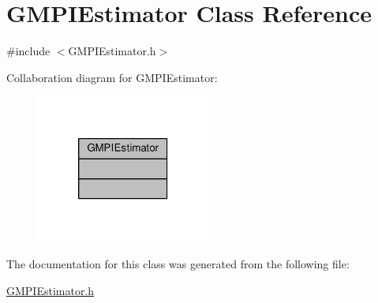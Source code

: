 \hypertarget{classGMPIEstimator}{\section{G\-M\-P\-I\-Estimator Class Reference}
\label{classGMPIEstimator}
}


{\ttfamily \#include $<$G\-M\-P\-I\-Estimator.\-h$>$}



Collaboration diagram for G\-M\-P\-I\-Estimator\-:
\nopagebreak
\begin{figure}[H]
\begin{center}
\leavevmode
\includegraphics[width=162pt]{classGMPIEstimator__coll__graph}
\end{center}
\end{figure}


The documentation for this class was generated from the following file\-:\begin{DoxyCompactItemize}
\item 
\hyperlink{GMPIEstimator_8h}{G\-M\-P\-I\-Estimator.\-h}\end{DoxyCompactItemize}
